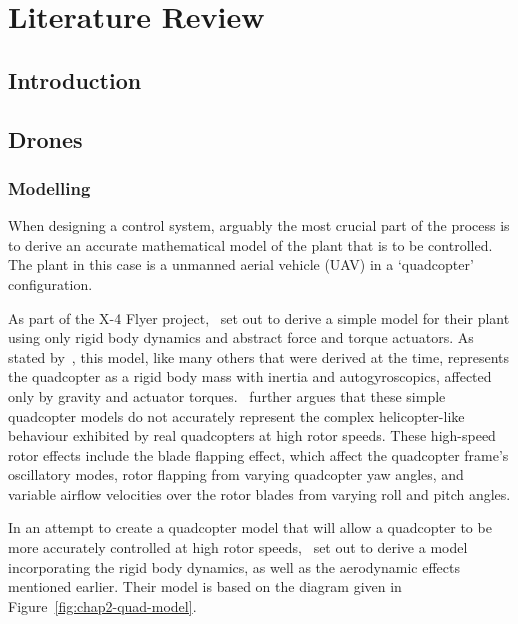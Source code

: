 \chapter{Literature Review}
\label{chap:lit-review}

\section{Introduction}

\section{Drones}

\subsection{Modelling}

When designing a control system, arguably the most crucial part of the process is to derive an accurate mathematical model of the plant that is to be controlled. The plant in this case is a unmanned aerial vehicle (UAV) in a `quadcopter' configuration. 

As part of the X-4 Flyer project,~\cite{hamel2002dynamic} set out to derive a simple model for their plant using only rigid body dynamics and abstract force and torque actuators. As stated by~\cite{Pounds2010c}, this model, like many others that were derived at the time, represents the quadcopter as a rigid body mass with inertia and autogyroscopics, affected only by gravity and actuator torques.~\citeauthor{Pounds2010c} further argues that these simple quadcopter models do not accurately represent the complex helicopter-like behaviour exhibited by real quadcopters at high rotor speeds. These high-speed rotor effects include the blade flapping effect, which affect the quadcopter frame's oscillatory modes, rotor flapping from varying quadcopter yaw angles, and variable airflow velocities over the rotor blades from varying roll and pitch angles.

In an attempt to create a quadcopter model that will allow a quadcopter to be more accurately controlled at high rotor speeds,~\citeauthor{Pounds2010c} set out to derive a model incorporating the rigid body dynamics, as well as the aerodynamic effects mentioned earlier. Their model is based on the diagram given in Figure~\ref{fig:chap2-quad-model}.

